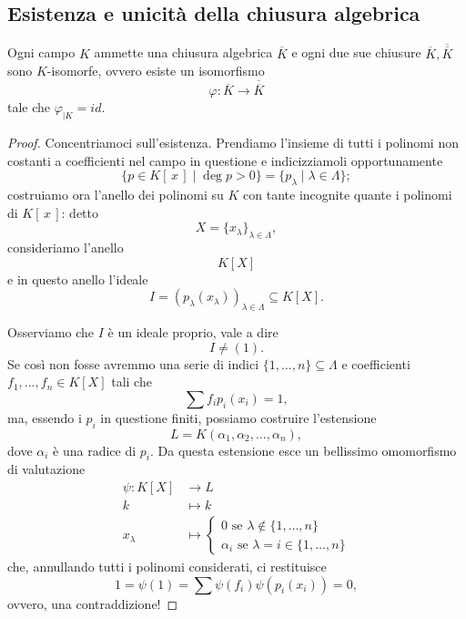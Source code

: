\subsection{Esistenza e unicità della chiusura algebrica}
\begin{multicols}{2}
	\setcounter{theorem}{4}
	\begin{theorem}
		Ogni campo $ K $ ammette una chiusura algebrica $ \overline{K} $ e ogni due sue chiusure $ \overline{K}, \overline{\overline{K}} $ sono $ K $-isomorfe, ovvero esiste un isomorfismo
		\[ \varphi : \overline{K} \to \overline{\overline{K}} \]
		tale che $ \varphi_{|K} = id $.
	\end{theorem}

\begin{proof}
	Concentriamoci sull'esistenza. Prendiamo l'insieme di tutti i polinomi non costanti a coefficienti nel campo in questione e indicizziamoli opportunamente
	$$  \{ p \in K[\,x\,] \mid \deg p > 0 \} = \{p_\lambda \mid \lambda \in \Lambda\};  $$
	costruiamo ora l'anello dei polinomi su $ K $ con tante incognite quante i polinomi di $ K[\,x\,] $: detto
	\[ X = \{ x_\lambda \}_{\lambda \in \Lambda}, \]
	consideriamo l'anello
	\[ K[X] \]
	e in questo anello l'ideale
	\[ I = (p_{\lambda}(x_{\lambda}))_{\lambda \in \Lambda} \subseteq K[X]. \]
	
	Osserviamo che $ I $ è un ideale proprio, vale a dire
	\[ I \neq (1). \]
	Se così non fosse avremmo una serie di indici $ \{1, \dots, n\} \subseteq \Lambda $ e coefficienti $ f_1, \dots, f_n \in K[X] $ tali che
	\[ \sum f_i p_i(x_i) = 1, \]
	ma, essendo i $ p_i $ in questione finiti, possiamo costruire l'estensione 
	$$  L = K(\alpha_1, \alpha_2, \dots, \alpha_n),  $$
	dove $ \alpha_i $ è una radice di $ p_i $.
	Da questa estensione esce un bellissimo omomorfismo di valutazione
	\begin{align*}
	\psi \colon K[X] &\to L \\
	k &\mapsto k \\
	x_\lambda &\mapsto \begin{cases}
	0 \text{ se } \lambda \notin \{1, \dots, n\}\\
	\alpha_i \text{ se } \lambda = i \in \{1, \dots, n\}
	\end{cases} 
	\end{align*}
	che, annullando tutti i polinomi considerati, ci restituisce
	\[ 1 = \psi(1) = \sum \psi(f_i)\psi(p_i(x_i)) = 0, \]
	ovvero, una contraddizione!
	

\end{proof}
\end{multicols}
